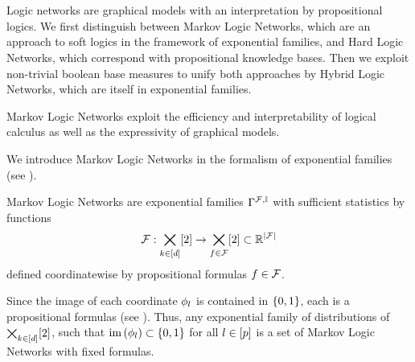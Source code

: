 \chapter{\chatextnetworkRepresentation}\label{cha:networkRepresentation}

Logic networks are graphical models with an interpretation by propositional logics.
We first distinguish between Markov Logic Networks, which are an approach to soft logics in the framework of exponential families, and Hard Logic Networks, which correspond with propositional knowledge bases.
Then we exploit non-trivial boolean base measures to unify both approaches by Hybrid Logic Networks, which are itself in exponential families.







Markov Logic Networks exploit the efficiency and interpretability of logical calculus as well as the expressivity of graphical models. 


We introduce Markov Logic Networks in the formalism of exponential families (see ).

\begin{definition}
	Markov Logic Networks are exponential families $\Gamma^{\mathcal{F},\mathbb{I}}$ with sufficient statistics by functions
		\[ \mathcal{F} : \bigtimes_{k\in[d]}[2] \rightarrow \bigtimes_{f\in\mathcal{F}}[2] \subset \mathbb{R}^{\left|\mathcal{F}\right|} \]
	defined coordinatewise by propositional formulas $f\in\mathcal{F}$.
\end{definition}



Since the image of each coordinate $\phi_{l}$ is contained in $\{0,1\}$, each is a propositional formulas (see ).
Thus, any exponential family of distributions of $\bigtimes_{k\in[d]}[2]$, such that $\mathrm{im}\left(\phi_{l}\right)\subset\{0,1\}$ for all $l\in[p]$ is a set of Markov Logic Networks with fixed formulas.

